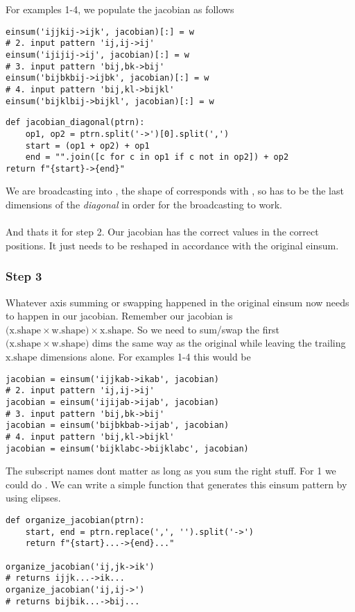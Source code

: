 \documentclass[11pt]{article}
\begin{document}
For examples 1-4, we populate the jacobian as follows

\begin{verbatim}
einsum('ijjkij->ijk', jacobian)[:] = w
# 2. input pattern 'ij,ij->ij'
einsum('ijijij->ij', jacobian)[:] = w
# 3. input pattern 'bij,bk->bij'
einsum('bijbkbij->ijbk', jacobian)[:] = w
# 4. input pattern 'bij,kl->bijkl'
einsum('bijklbij->bijkl', jacobian)[:] = w
\end{verbatim}

\begin{verbatim}
def jacobian_diagonal(ptrn):
    op1, op2 = ptrn.split('->')[0].split(',')
    start = (op1 + op2) + op1
    end = "".join([c for c in op1 if c not in op2]) + op2
return f"{start}->{end}"
\end{verbatim}

We are broadcasting  into 
, the shape of 
corresponds with , so  
has to be the last dimensions of the \emph{diagonal} in order for the broadcasting
to work. \\\\
And thats it for step 2. Our jacobian has the correct values in the correct positions.
It just needs to be reshaped in accordance with the original einsum.

\subsubsection*{Step 3}

Whatever axis summing or swapping happened in the original einsum now needs to happen in our jacobian.
Remember our jacobian is $\big(\text{x.shape} \times \text{w.shape} \big) \times \text{x.shape}$.
So we need to sum/swap the first  $\big(\text{x.shape} \times \text{w.shape} \big) $ dims 
the same way as the original while leaving the trailing $\text{x.shape}$ dimensions alone. 
For examples 1-4 this would be

\begin{verbatim}
jacobian = einsum('ijjkab->ikab', jacobian) 
# 2. input pattern 'ij,ij->ij'
jacobian = einsum('ijijab->ijab', jacobian) 
# 3. input pattern 'bij,bk->bij'
jacobian = einsum('bijbkbab->ijab', jacobian) 
# 4. input pattern 'bij,kl->bijkl'
jacobian = einsum('bijklabc->bijklabc', jacobian)
\end{verbatim}

The subscript names dont matter as long as you sum the right stuff. For 1 we could do
.  We can write a simple function that generates this einsum 
pattern by using elipses. 
\begin{verbatim}
def organize_jacobian(ptrn):
    start, end = ptrn.replace(',', '').split('->')
    return f"{start}...->{end}..."

organize_jacobian('ij,jk->ik')
# returns ijjk...->ik...
organize_jacobian('ij,ij->')
# returns bijbik...->bij...
\end{verbatim}
\end{document}
